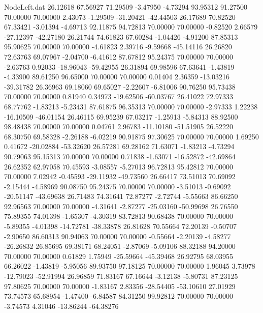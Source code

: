 \begin{filecontents}{NodeLeft.dat}
  26.12618   67.56927   71.29509    -3.47950   -4.73294   93.95312   91.27500   70.00000   70.00000    2.43073   -1.29509  -31.20421  -42.44503
  26.17689   70.82520   67.33421    -3.01394   -4.69713   92.11875   94.72813   70.00000   70.00000   -0.82520    2.66579  -27.12397  -42.27180
  26.21744   74.61823   67.60284    -1.04426   -4.91200   87.85313   95.90625   70.00000   70.00000   -4.61823    2.39716   -9.59668  -45.14116
  26.26820   72.63763   69.07967    -2.04700   -6.41612   87.67812   95.24375   70.00000   70.00000   -2.63763    0.92033  -18.96043  -59.42955
  26.31894   69.98596   67.63641    -1.43819   -4.33900   89.61250   96.65000   70.00000   70.00000    0.01404    2.36359  -13.03216  -39.31782
  26.36963   69.18060   69.65027    -2.22607   -6.81006   90.76250   95.73438   70.00000   70.00000    0.81940    0.34973  -19.62506  -60.03767
  26.41022   72.97333   68.77762    -1.83213   -5.23431   87.61875   96.35313   70.00000   70.00000   -2.97333    1.22238  -16.10509  -46.01154
  26.46115   69.95239   67.03217    -1.25913   -5.84313   88.92500   98.48438   70.00000   70.00000    0.04761    2.96783  -11.10180  -51.51905
  26.52220   68.30750   69.58328    -2.26188   -6.02219   90.91875   97.30625   70.00000   70.00000    1.69250    0.41672  -20.02884  -53.32620
  26.57281   69.28162   71.63071    -1.83213   -4.73294   90.79063   95.15313   70.00000   70.00000    0.71838   -1.63071  -16.52872  -42.69864
  26.62352   62.97058   70.45593    -3.08557   -5.27013   96.72813   95.42812   70.00000   70.00000    7.02942   -0.45593  -29.11932  -49.73560
  26.66417   73.51013   70.69092    -2.15444   -4.58969   90.08750   95.24375   70.00000   70.00000   -3.51013   -0.69092  -20.51147  -43.69638
  26.71483   74.31641   72.87277    -2.72744   -5.55663   86.66250   92.96563   70.00000   70.00000   -4.31641   -2.87277  -25.03160  -50.99698
  26.76550   75.89355   74.01398    -1.65307   -4.30319   83.72813   90.68438   70.00000   70.00000   -5.89355   -4.01398  -14.72781  -38.33878
  26.81628   70.55664   72.20139    -0.50707   -2.90650   86.60313   90.94063   70.00000   70.00000   -0.55664   -2.20139   -4.58277  -26.26832
  26.85695   69.38171   68.24051    -2.87069   -5.09106   88.32188   94.20000   70.00000   70.00000    0.61829    1.75949  -25.59664  -45.39468
  26.92795   68.03955   66.26022    -1.43819   -5.95056   89.93750   97.18125   70.00000   70.00000    1.96045    3.73978  -12.79023  -52.91994
  26.96859   71.83167   67.16644    -3.12138   -5.80731   87.23125   97.80625   70.00000   70.00000   -1.83167    2.83356  -28.54405  -53.10610
  27.01929   73.74573   65.68954    -1.47400   -6.84587   84.31250   99.92812   70.00000   70.00000   -3.74573    4.31046  -13.86244  -64.38276

\end{filecontents}

